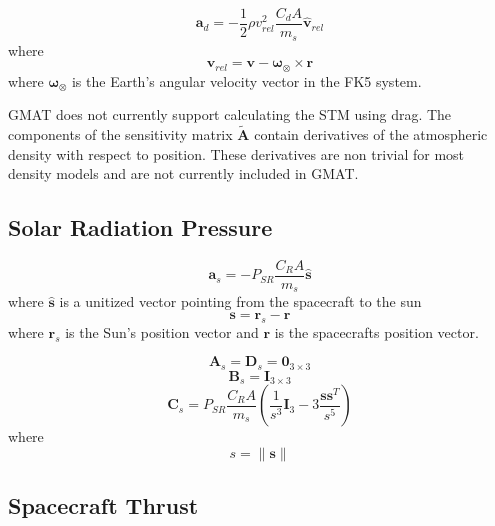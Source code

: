\begin{equation}
  \mathbf{a}_d = - \displaystyle\frac{1}{2}\rho v_{rel}^2 \displaystyle\frac{C_d
   A}{m_s}\hat{\mathbf{v}}_{rel}
\end{equation}
%
where
%
\begin{equation}
    \mathbf{v}_{rel} = \mathbf{v} - \boldsymbol{\omega}_\otimes \times
    \mathbf{r}
\end{equation}
%
where $\boldsymbol{\omega}_\otimes$ is the Earth's angular velocity
vector in the FK5 system.

GMAT does not currently support calculating the STM using drag.  The
components of the sensitivity matrix  $\tilde{\mathbf A}$ contain
derivatives of the atmospheric density with respect to position.
These derivatives are non trivial for most density models and are
not currently included in GMAT.

\subsection{Solar Radiation Pressure}

\begin{equation}
     \mathbf{a}_s = -P_{SR}\displaystyle\frac{   C_R A    }{m_s}\hat{\mathbf{s}}
\end{equation}
%
where $\hat{\mathbf{s}}$ is a unitized vector pointing from the
spacecraft to the sun
%
\begin{equation}
    \mathbf{s} = \mathbf{r}_s - \mathbf{r}
\end{equation}
%
where $\mathbf{r}_s$ is the Sun's position vector and $\mathbf{r}$
is the spacecrafts position vector.



\begin{equation}
    \mathbf{A}_{s} = \mathbf{D}_{s}  = \mathbf{0}_{3\times3}
\end{equation}
%
\begin{equation}
    \mathbf{B}_{s} = \mathbf{I}_{3\times3}
\end{equation}
%
\begin{equation}
    \mathbf{C}_{s} = P_{SR}\displaystyle\frac{   C_R A
    }{m_s}\left( \frac{1}{s^3}\mathbf{I}_3 - 3 \frac{ \mathbf{s}\mathbf{s}^T}{s^5}\right)
\end{equation}
%
where
%
\begin{equation}
    s = \| \mathbf{s} \|
\end{equation}

\subsection{Spacecraft Thrust}

